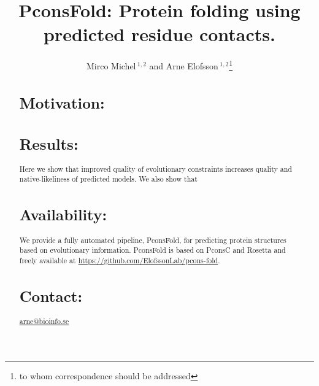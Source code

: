 \documentclass{bioinfo}
\begin{document}

\title[short Title]{PconsFold: Protein folding using predicted residue contacts.}
\author[Sample \textit{et~al}]{Mirco Michel\,$^{1,2}$ and Arne Elofsson\,$^{1,2}$\footnote{to whom correspondence should be addressed}}
\address{$^{1}$Department of Biochemistry and Biophysics, Stockholm University, 10691 Stockholm, Sweden\\
$^{2}$Science for Life Laboratory, Box 1031, 17121 Solna, Sweden}



\maketitle

\begin{abstract}

\section{Motivation:}

\section{Results:}
Here we show that improved quality of evolutionary constraints increases quality and native-likeliness of predicted models. We also show that 
\section{Availability:}
We provide a fully automated pipeline, PconsFold, for predicting protein structures based on evolutionary information. PconsFold is based on PconsC and Rosetta and freely available at \url{https://github.com/ElofssonLab/pcons-fold}.
\section{Contact:} \href{arne@bioinfo.se}{arne@bioinfo.se}
\end{abstract}
\end{document}
